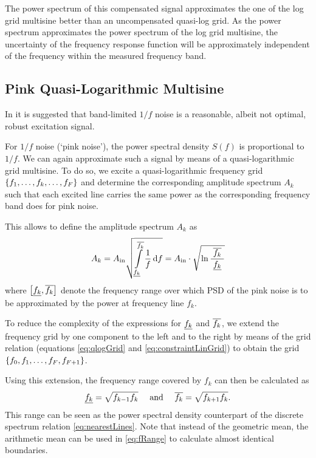   The power spectrum of this compensated signal approximates the one of the log grid multisine better than an uncompensated quasi-log grid.
  As the power spectrum approximates the power spectrum of the log grid multisine, the uncertainty of the frequency response function will be approximately independent of the frequency within the measured frequency band.

  \subsection{Pink Quasi-Logarithmic Multisine}
  In \citep{Rojas2007} it is suggested that band-limited $1/f$ noise is a reasonable, albeit not optimal, robust excitation signal.

  For $1/f$ noise (`pink noise'), the power spectral density $S(f)$ is proportional to $1/f$.
  We can again approximate such a signal by means of a quasi-logarithmic grid multisine.
  To do so, we excite a quasi-logarithmic frequency grid $\left\{f_1,\ldots,f_k,\ldots,f_F\right\}$ and determine the corresponding amplitude spectrum $A_k$ such that each excited line carries the same power as the corresponding frequency band does for pink noise.

  This allows to define the amplitude spectrum $A_k$ as
  \begin{equation}
    A_k = A_{\mathrm{in}}
                 \sqrt{\int_{\underline{f_{k}}}
                     ^{\overline{f_{k}}}
                     \limits
                     \frac{1}
                          {f}
                     \,\mathrm{d}{f}}
          = A_{\mathrm{in}}
                \cdot
                \sqrt{
                \ln \frac{\;\overline{f_{k}}\;}{\underline{f_{k}}}
                }
  \end{equation}
  where $\left[ \underline{f_{k}}, \overline{f_{k}} \right] $ denote the frequency range over which PSD of the pink noise is to be approximated by the power at frequency line $f_k$.

  To reduce the complexity of the expressions for $\underline{f_{k}}$ and $\overline{f_{k}}$, we extend the frequency grid by one component to the left and to the right by means of the grid relation (equations \eqref{eq:qlogGrid} and \eqref{eq:constraintLinGrid}) to obtain the grid $\left\{f_0, f_1, \ldots, f_F, f_{F+1}\right\}$.

  Using this extension, the frequency range covered by $f_k$ can then be calculated as
    \begin{align}
      \underline{f_{k}} = \sqrt{f_{k-1} f_k}
      \quad \text{ and } \quad 
      \overline{f_{k}} = \sqrt{f_{k+1} f_k}
    \label{eq:fRange}
    \text{.}
    \end{align}
  This range can be seen as the power spectral density counterpart of the discrete spectrum relation \eqref{eq:nearestLines}.
  Note that instead of the geometric mean, the arithmetic mean can be used in \eqref{eq:fRange} to calculate almost identical boundaries.

